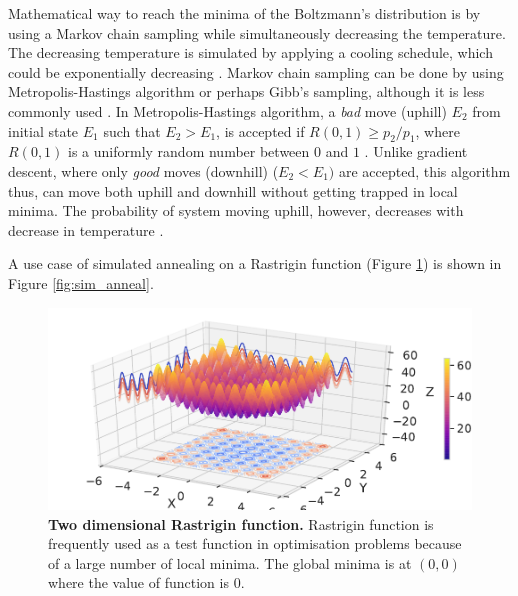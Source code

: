 Mathematical way to reach the minima of the Boltzmann's distribution is by using a Markov chain sampling while simultaneously decreasing the temperature. The decreasing temperature is simulated by applying a cooling schedule, which could be exponentially decreasing \cite{Kirkpatrick1983-hh}. Markov chain sampling can be done by using Metropolis-Hastings algorithm or perhaps Gibb's sampling, although it is less commonly used  \cite{Keith2002-jx}. In Metropolis-Hastings algorithm, a \textit{bad} move (uphill) $E_2$ from initial state $E_1$ such that $E_2 > E_1$, is accepted if $R(0,1) \geq p_2/p_1$, where $R(0,1)$ is a uniformly random number between $0$ and $1$ \cite{hastings1970monte}. Unlike gradient descent, where only \textit{good} moves (downhill) ($E_2 < E_1)$ are accepted, this algorithm thus, can move both uphill and downhill without getting trapped in local minima. The probability of system moving uphill, however, decreases with decrease in temperature \cite{presse1988numerical}. 


A use case of simulated annealing on a Rastrigin function (Figure \ref{fig:rastrigin}) is shown in Figure \ref{fig:sim_anneal}. 

\begin{figure}[H]
\center
\includegraphics[width=1\textwidth]{chapters/Introduction/Figures/rastrigin.pdf}
\caption[Two dimensional Rastrigin function.]{\textbf{Two dimensional Rastrigin function.} Rastrigin function is frequently used as a test function in optimisation problems because of a large number of local minima. The global minima is at $(0, 0)$ where the value of function is $0$.}%
\label{fig:rastrigin}
\end{figure}


